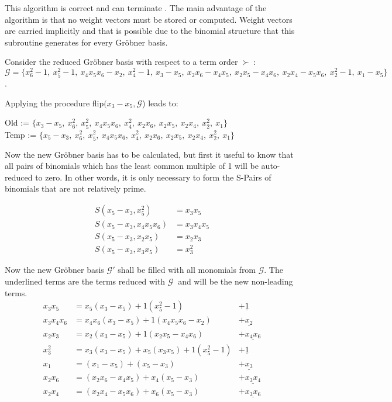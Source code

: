 This algorithm is correct and can terminate \cite{tigers}.
The main advantage of the algorithm is that no weight vectors must be stored or computed.
Weight vectors are carried implicitly and that is possible due to the binomial structure that this subroutine generates for every Gröbner basis.

\begin{env_example}\normalfont
Consider the reduced Gröbner basis with respect to a term order $\succ~$: $\mathcal{G}= \{x_{6}^{2}-1,~x_{5}^{2}-1,~x_{4}x_{5}x_{6} -x_{2},~x_{4}^{2}-1,~x_{3}-x_{5},~x_{2}x_{6}-x_{4}x_{5},~x_{2}x_{5}-x_{4}x_{6},~x_{2}x_{4}-x_{5}x_{6},~x_{2}^{2}-1,~x_{1}-x_{5}  \} $.

Applying the procedure flip$(x_{3}-x_{5}, \mathcal{G}$) leads to:

Old := $\{x_{3}-x_{5},~x_{6}^{2},~x_{5}^{2},~x_{4}x_{5}x_{6} ,~x_{4}^{2},~x_{2}x_{6},~x_{2}x_{5},~x_{2}x_{4},~x_{2}^{2},~x_{1} \} $ \\
Temp := $\{x_{5}-x_{3},~x_{6}^{2},~x_{5}^{2},~x_{4}x_{5}x_{6} ,~x_{4}^{2},~x_{2}x_{6},~x_{2}x_{5},~x_{2}x_{4},~x_{2}^{2},~x_{1} \} $

Now the new Gröbner basis has to be calculated, but first it useful to know that all pairs of binomials which has the least common multiple of 1 will be auto-reduced to zero. In other words, it is only necessary to form the S-Pairs of binomials that are not relatively prime.

\begin{align*}
	S(x_{5}-x_{3},x_{5}^{2}) &= x_{3}x_{5} \\
	S(x_{5}-x_{3},x_{4}x_{5}x_{6}) &= x_{3}x_{4}x_{5} \\
	S(x_{5}-x_{3},x_{2}x_{5}) &= x_{2}x_{3} \\
	S(x_{5}-x_{3},x_{3}x_{5}) &= x_{3}^{2}
\end{align*}

Now the new Gröbner basis $\mathcal{G}'$ shall be filled with all monomials from $\mathcal{G}$.
The underlined terms are the terms reduced with $\mathcal{G}~$ and will be the new non-leading terms.
\begin{align*}
	x_{3}x_{5} &= x_{5}(x_{3}-x_{5}) + 1(x_{5}^{2}-1) &+ \underline{1} \\
	x_{3}x_{4}x_{6} &= x_{4}x_{6}(x_{3}-x_{5}) + 1(x_{4}x_{5}x_{6}-x_{2}) &+ \underline{x_{2}} \\
	x_{2}x_{3} &= x_{2}(x_{3}-x_{5}) + 1(x_{2}x_{5}- x_{4}x_{6}) &+ \underline{x_{4}x_{6}} \\
	x_{3}^{2} &= x_{3}(x_{3}-x_{5}) + x_{5}(x_{3}x_{5}) + 1(x_{5}^{2}-1)&+\underline{1} \\
	x_{1} &= (x_{1}-x_{5}) + (x_{5}-x_{3}) &+\underline{ x_{3}} \\
	x_{2}x_{6} &= (x_{2}x_{6}-x_{4}x_{5}) + x_{4}(x_{5}-x_{3}) &+\underline{ x_{3}x_{4}} \\
	x_{2}x_{4} &= (x_{2}x_{4}-x_{5}x_{6})+ x_{6}(x_{5}-x_{3}) &+\underline{x_{3}x_{6}}
\end{align*}


\end{env_example}
